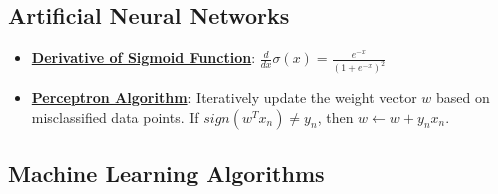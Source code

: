 \documentclass{article}%
\begin{document}
%
\subsection{Artificial Neural Networks}%
\label{subsec:ArtificialNeuralNetworks}%
\begin{itemize}[leftmargin=*]%
\item \href{https://purdue.brightspace.com/d2l/common/assets/pdfjs-d2l-dist/1.0.14-legacy/web/viewer.html?file=\%2Fcontent\%2Fenforced\%2F1095467-wl.202510.CS.24300.001\%2F04L1-Linear Algebra Primer.pdf\%3Fou\%3D1095467\&lang=en-us\&container=d2l-fileviewer-rendered-pdf\&fullscreen=d2l-fileviewer-rendered-pdf-dialog\&height=667#page=21}{\textbf{Derivative of Sigmoid Function}}: $\frac{d}{dx} \sigma(x) = \frac{e^{-x}}{(1 + e^{-x})^2}$%
\item \href{https://purdue.brightspace.com/d2l/common/assets/pdfjs-d2l-dist/1.0.14-legacy/web/viewer.html?file=\%2Fcontent\%2Fenforced\%2F1095467-wl.202510.CS.24300.001\%2F05L2-ML Basics.pdf\%3Fou\%3D1095467\&lang=en-us\&container=d2l-fileviewer-rendered-pdf\&fullscreen=d2l-fileviewer-rendered-pdf-dialog\&height=667#page=30}{\textbf{Perceptron Algorithm}}: Iteratively update the weight vector $w$ based on misclassified data points. If $sign(w^Tx_n) \ne y_n$, then $w \leftarrow w + y_nx_n$.%
\end{itemize}

%
\subsection{Machine Learning Algorithms}%
\label{subsec:MachineLearningAlgorithms}%
\begin{itemize}[leftmargin=*]%
%
\end{itemize}

%
\end{document}
